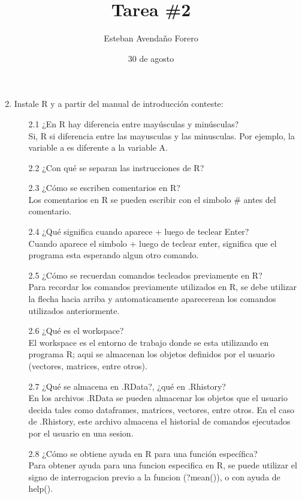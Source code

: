 \documentclass[letterpaper, 12pt]{article}
\title{Tarea \#2}
\author{Esteban Avendaño Forero}
\date{30 de agosto}
\begin{document}


\maketitle

\begin{enumerate}
\setcounter{enumi}{1}
\item Instale R y a partir del manual de introducción conteste:
\begin{enumerate}
\item[2.1] ¿En R hay diferencia entre mayúsculas y minúsculas?\\
Si, R si diferencia entre las mayusculas y las minusculas. Por ejemplo, la 
variable a es diferente a la variable A.
\item[2.2] ¿Con qué se separan las instrucciones de R?
\item[2.3] ¿Cómo se escriben comentarios en R?\\
Los comentarios en R se pueden escribir con el simbolo \# antes del comentario.
\item[2.4] ¿Qué significa cuando aparece + luego de teclear Enter?\\
Cuando aparece el simbolo + luego de teclear enter, significa que el programa 
esta esperando algun otro comando.
\item[2.5] ¿Cómo se recuerdan comandos tecleados previamente en R?\\
Para recordar los comandos previamente utilizados en R, se debe utilizar la 
flecha hacia arriba y automaticamente aparecerean los comandos utilizados 
anteriormente.
\item[2.6] ¿Qué es el workspace?\\
El workspace es el entorno de trabajo donde se esta utilizando en programa R; 
aqui se almacenan los objetos definidos por el usuario (vectores, matrices, 
entre otros).
\item[2.7] ¿Qué se almacena en .RData?, ¿qué en .Rhistory?\\
En los archivos .RData se pueden almacenar los objetos que el usuario decida 
tales como dataframes, matrices, vectores, entre otros. En el caso de .Rhistory,
este archivo almacena el historial de comandos ejecutados por el usuario en una 
sesion.
\item[2.8] ¿Cómo se obtiene ayuda en R para una función específica?\\
Para obtener ayuda para una funcion especifica en R, se puede utilizar el signo
de interrogacion previo a la funcion (?mean()), o con ayuda de help().

\end{enumerate}
\end{enumerate}
\end{document}
